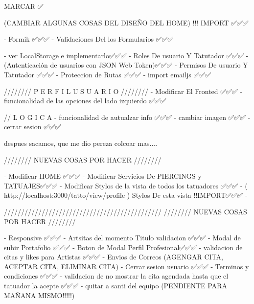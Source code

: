 
MARCAR ✅

(CAMBIAR ALGUNAS COSAS DEL DISEÑO DEL HOME) !!! IMPORT  ✅✅✅

    - Formik ✅✅✅
    - Validaciones Del los Formularios ✅✅✅

    - ver LocalStorage e implementarlo✅✅✅
    - Roles De usuario Y Tatutador ✅✅✅
    - (Autenticación de usuarios con JSON Web Token)✅✅✅
    - Permisos De usuario Y Tatutador ✅✅✅
    - Proteccion de Rutas ✅✅✅
    - import emailjs ✅✅✅



////////   P E R F I L   U S U A R I O   ////////  
    - Modificar El Fronted ✅✅✅
    - funcionalidad de las opciones del lado izquierdo ✅✅✅

    // L O G I C A
    - funcionalidad de autualzar info ✅✅✅
    - cambiar imagen ✅✅✅
    - cerrar sesion ✅✅✅

despues sacamos, que me dio pereza colcoar mas....

////////   NUEVAS COSAS POR HACER    ////////  

    - Modificar HOME ✅✅✅
    - Modificar Servicios De PIERCINGS y TATUAJES✅✅✅
    - Modificar Stylos de la vista de todos los tatuadores ✅✅✅
    - ( http://localhost:3000/tatto/view/profile )  Stylos De esta vista !!IMPORT✅✅✅
    -


//////////////////////////////////////////////
////////   NUEVAS COSAS POR HACER    //////// 

    - Responsive ✅✅✅
    - Artsitas del momento Titulo validacion ✅✅✅
    - Modal de subir Portafolio ✅✅✅
    - Boton de Modal Perfil Profesional✅✅✅
    - validacion de citas y likes para Artistas ✅✅✅
    - Envios de Correos (AGENGAR CITA,  ACEPTAR CITA, ELIMINAR CITA)
    - Cerrar sesion usuario ✅✅✅
    - Terminos y condiciones ✅✅✅
    - validacion de no mostrar la cita agendada hasta que el tatuador la acepte ✅✅✅
    - quitar a santi del equipo (PENDIENTE PARA MAÑANA MISMO!!!!!)





